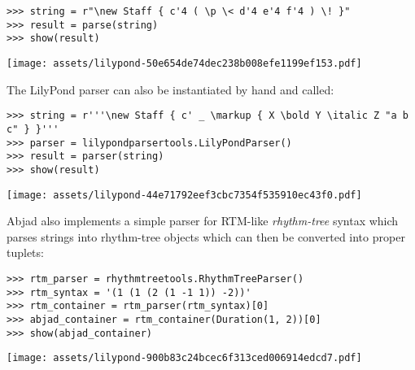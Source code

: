 \begin{abjadbookoutput}
\begin{singlespacing}
\vspace{-0.5\baselineskip}
\begin{verbatim}
>>> string = r"\new Staff { c'4 ( \p \< d'4 e'4 f'4 ) \! }"
>>> result = parse(string)
>>> show(result)
\end{verbatim}
\noindent\texttt{[image: assets/lilypond-50e654de74dec238b008efe1199ef153.pdf]}
\end{singlespacing}
\end{abjadbookoutput}

\noindent The LilyPond parser can also be instantiated by hand and called:

\begin{comment}
<abjad>
string = r'''\new Staff { c' _ \markup { X \bold Y \italic Z "a b c" } }'''
parser = lilypondparsertools.LilyPondParser()
result = parser(string)
show(result)
</abjad>
\end{comment}

\begin{abjadbookoutput}
\begin{singlespacing}
\vspace{-0.5\baselineskip}
\begin{verbatim}
>>> string = r'''\new Staff { c' _ \markup { X \bold Y \italic Z "a b c" } }'''
>>> parser = lilypondparsertools.LilyPondParser()
>>> result = parser(string)
>>> show(result)
\end{verbatim}
\noindent\texttt{[image: assets/lilypond-44e71792eef3cbc7354f535910ec43f0.pdf]}
\end{singlespacing}
\end{abjadbookoutput}

\noindent Abjad also implements a simple parser for RTM-like \emph{rhythm-tree}
syntax which parses strings into rhythm-tree objects which can then be
converted into proper tuplets:

\begin{comment}
<abjad>
rtm_parser = rhythmtreetools.RhythmTreeParser()
rtm_syntax = '(1 (1 (2 (1 -1 1)) -2))'
rtm_container = rtm_parser(rtm_syntax)[0]
abjad_container = rtm_container(Duration(1, 2))[0]
show(abjad_container)
</abjad>
\end{comment}

\begin{abjadbookoutput}
\begin{singlespacing}
\vspace{-0.5\baselineskip}
\begin{verbatim}
>>> rtm_parser = rhythmtreetools.RhythmTreeParser()
>>> rtm_syntax = '(1 (1 (2 (1 -1 1)) -2))'
>>> rtm_container = rtm_parser(rtm_syntax)[0]
>>> abjad_container = rtm_container(Duration(1, 2))[0]
>>> show(abjad_container)
\end{verbatim}
\noindent\texttt{[image: assets/lilypond-900b83c24bcec6f313ced006914edcd7.pdf]}
\end{singlespacing}
\end{abjadbookoutput}

